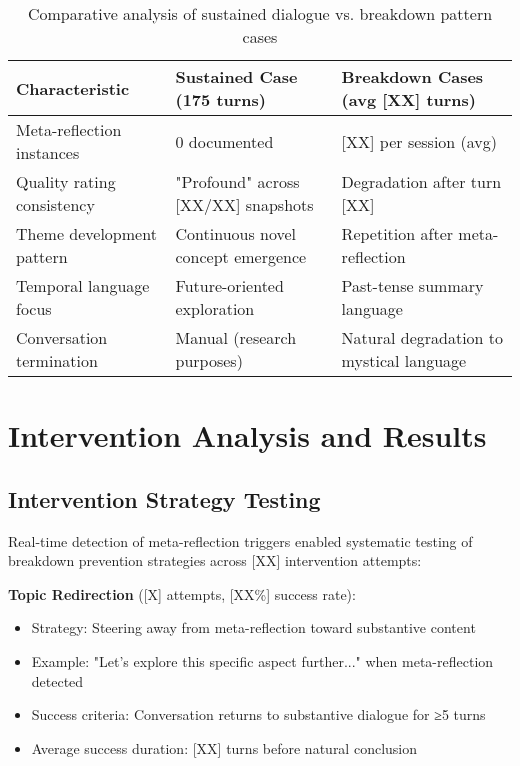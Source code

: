 \documentclass[11pt,letterpaper]{article}
\newcommand{\meanBreakdownTurn}{[XX]} %
\begin{document}
\begin{table}[h]
\centering
\begin{tabular}{p{4cm}p{5cm}p{5cm}}
\toprule
\textbf{Characteristic} & \textbf{Sustained Case (175 turns)} & \textbf{Breakdown Cases (avg \meanBreakdownTurn{} turns)} \\
\midrule
Meta-reflection instances & 0 documented & [XX] per session (avg) \\
Quality rating consistency & "Profound" across [XX/XX] snapshots & Degradation after turn [XX] \\
Theme development pattern & Continuous novel concept emergence & Repetition after meta-reflection \\
Temporal language focus & Future-oriented exploration & Past-tense summary language \\
Conversation termination & Manual (research purposes) & Natural degradation to mystical language \\
\bottomrule
\end{tabular}
\caption{Comparative analysis of sustained dialogue vs. breakdown pattern cases}
\label{tab:sustained_comparison}
\end{table}

\section{Intervention Analysis and Results}
\label{app:intervention}

\subsection{Intervention Strategy Testing}

Real-time detection of meta-reflection triggers enabled systematic testing of breakdown prevention strategies across [XX] intervention attempts:

\textbf{Topic Redirection} ([X] attempts, [XX\%] success rate):
\begin{itemize}
    \item Strategy: Steering away from meta-reflection toward substantive content
    \item Example: "Let's explore this specific aspect further..." when meta-reflection detected
    \item Success criteria: Conversation returns to substantive dialogue for ≥5 turns
    \item Average success duration: [XX] turns before natural conclusion
\end{itemize}
\end{document}
